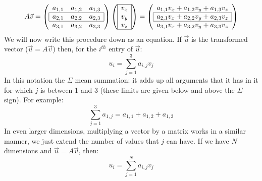 \documentclass[a4paper]{report}
\begin{document}
\begin{equation}
A\vec{v} = 
\left( \begin{array}{ccc} 
a_{1,1} & a_{1,2} & a_{1,3} \\ \cline{1-3} 
\multicolumn{1}{|c}{a_{2,1}} & a_{2,2} &\multicolumn{1}{c|}{a_{2,3}} \\ \cline{1-3}
a_{3,1} & a_{3,2} & a_{3,3} 
\end{array} \right) 
\left(\begin{array}{|c|} \cline{1-1} v_x \\ v_y \\ v_z \\ \cline{1-1} \end{array}\right) = \left( \begin{array}{c} 
a_{1,1}v_x + a_{1,2}v_y + a_{1,3}v_z \\ \cline{1-1} \multicolumn{1}{|c|}{a_{2,1}v_x + a_{2,2}v_y + a_{2,3}v_z} \\ \cline{1-1} a_{3,1}v_x + a_{3,2}v_y + a_{3,3}v_z\end{array} \right)
\end{equation}
We will now write this procedure down as an equation. If $\vec{u}$ is the transformed vector ($\vec{u}=A\vec{v}$) then, for the $i^{th}$ entry of $\vec{u}$:
\begin{equation}
u_i = \sum_{j=1}^3 a_{i,j} v_j 
\end{equation}
In this notation the $\Sigma$ mean summation: it adds up all arguments that it has in it for which $j$ is between 1 and 3 (these limits are given below and above the $\Sigma$-sign). For example:
\begin{equation}
\sum_{j=1}^3 a_{1,j} = a_{1,1} + a_{1,2} + a_{1,3}
\end{equation}
In even larger dimensions, multiplying a vector by a matrix works in a similar manner, we just extend the number of values that $j$ can have. If we have $N$ dimensions and $\vec{u}=A\vec{v}$, then:
\begin{equation}
u_i = \sum_{j=1}^N a_{i,j} v_j 
\end{equation}
\end{document}
